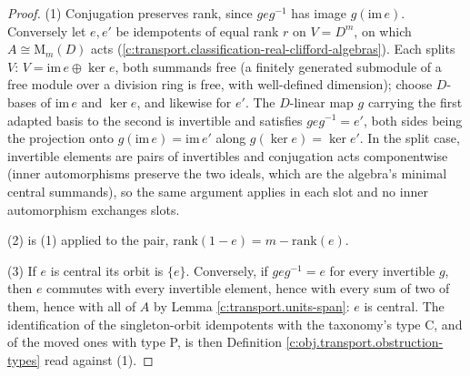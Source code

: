 \documentclass[11pt]{article}
\theoremstyle{definition}
\theoremstyle{plain}
\providecommand{\Mat}{}\renewcommand{\Mat}{\mathrm{M}}
\begin{document}
\begin{proof}
(1) Conjugation preserves rank, since $geg^{-1}$ has image $g(\mathrm{im}\, e)$. Conversely let $e, e'$ be idempotents of equal rank $r$ on $V = D^m$, on which $A \cong \Mat_m(D)$ acts (\ref{c:transport.classification-real-clifford-algebras}). Each splits $V$: $V = \mathrm{im}\,e \oplus \ker e$, both summands free (a finitely generated submodule of a free module over a division ring is free, with well-defined dimension); choose $D$-bases of $\mathrm{im}\,e$ and $\ker e$, and likewise for $e'$. The $D$-linear map $g$ carrying the first adapted basis to the second is invertible and satisfies $g e g^{-1} = e'$, both sides being the projection onto $g(\mathrm{im}\,e) = \mathrm{im}\,e'$ along $g(\ker e) = \ker e'$. In the split case, invertible elements are pairs of invertibles and conjugation acts componentwise (inner automorphisms preserve the two ideals, which are the algebra's minimal central summands), so the same argument applies in each slot and no inner automorphism exchanges slots.

(2) is (1) applied to the pair, $\mathrm{rank}(1-e) = m - \mathrm{rank}(e)$.

(3) If $e$ is central its orbit is $\{e\}$. Conversely, if $geg^{-1} = e$ for every invertible $g$, then $e$ commutes with every invertible element, hence with every sum of two of them, hence with all of $A$ by Lemma \ref{c:transport.units-span}: $e$ is central. The identification of the singleton-orbit idempotents with the taxonomy's type C, and of the moved ones with type P, is then Definition \ref{c:obj.transport.obstruction-types} read against (1).

\end{proof}
\end{document}
